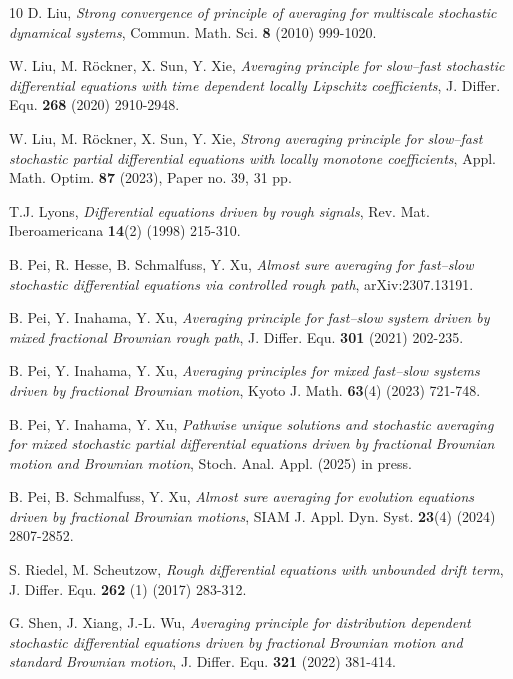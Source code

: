 \documentclass[10pt,a4paper]{article}
\numberwithin{equation}{section}
\begin{document}
\begin{thebibliography}{10}
 D. Liu, \emph{Strong convergence of principle of averaging for multiscale stochastic dynamical systems}, Commun. Math. Sci. {\bf 8} (2010) 999-1020.


 W. Liu, M. R\"{o}ckner, X. Sun, Y. Xie, \emph{Averaging principle for slow--fast stochastic differential equations with time dependent locally Lipschitz coefficients}, J. Differ. Equ. {\bf 268} (2020) 2910-2948.



 W. Liu, M. R\"{o}ckner, X. Sun, Y. Xie, \emph{Strong averaging principle for slow--fast stochastic partial differential equations with locally monotone coefficients}, Appl. Math. Optim. {\bf 87} (2023), Paper no. 39, 31 pp.


 T.J. Lyons,  \emph{Differential equations driven by rough signals}, Rev. Mat. Iberoamericana {\bf 14}(2) (1998) 215-310.


 B. Pei, R. Hesse, B. Schmalfuss, Y. Xu, \emph{Almost sure averaging for fast--slow stochastic differential equations via controlled rough path}, arXiv:2307.13191.


 B. Pei, Y. Inahama, Y. Xu, \emph{Averaging principle for fast--slow system driven by mixed fractional Brownian rough path}, J. Differ. Equ. {\bf 301} (2021) 202-235.


 B. Pei, Y. Inahama, Y. Xu, \emph{Averaging principles for mixed fast--slow systems driven by fractional Brownian motion}, Kyoto J. Math. {\bf 63}(4) (2023) 721-748.


 B. Pei, Y. Inahama, Y. Xu, \emph{Pathwise unique solutions and stochastic averaging for mixed stochastic partial differential equations driven by fractional Brownian motion and Brownian motion}, Stoch. Anal. Appl. (2025) in press.


 B. Pei, B. Schmalfuss, Y. Xu, \emph{Almost sure averaging for evolution equations driven by fractional Brownian motions}, SIAM J. Appl. Dyn. Syst. {\bf 23}(4) (2024) 2807-2852.


 S. Riedel, M. Scheutzow,
\emph{Rough differential equations with unbounded drift term},
J. Differ. Equ. {\bf 262} (1) (2017) 283-312.


 G. Shen, J. Xiang, J.-L. Wu, \emph{Averaging principle for distribution dependent stochastic differential equations driven by fractional Brownian motion and standard Brownian motion}, J. Differ. Equ. {\bf 321} (2022) 381-414.



\end{thebibliography}
\end{document}
